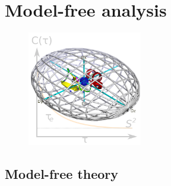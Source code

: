 
\chapter{Model-free analysis}
\label{ch: model-free}


\begin{figure}[h]
  \includegraphics[width=5cm, bb=0 0 1701 1701]{graphics/analyses/model_free/model_free_600x600}
\end{figure}



\section{Model-free theory}



